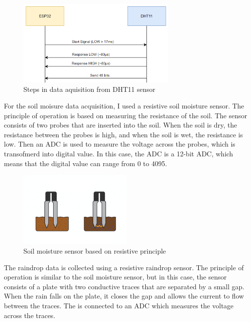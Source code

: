 \begin{figure}[H]
    \centering
    \includegraphics[width=0.7\textwidth]{images/dht-steps.png}
    \caption{Steps in data aquisition from DHT11 sensor}
    \label{fig:dht-steps}
\end{figure}

For the soil moisure data acquisition, I used a resistive soil moisture sensor. The principle of operation is based
on measuring the resistance of the soil. The sensor consists of two probes that are inserted into the soil.
When the soil is dry, the resistance between the probes is high, and when the soil is wet, the resistance is low\cite{s20020363}.
Then an ADC is used to measure the voltage across the probes, which is transofmerd into digital value. In this case, the
ADC is a 12-bit ADC, which means that the digital value can range from 0 to 4095.

\begin{figure}[H]
    \centering
    \includegraphics[width=0.5\textwidth]{images/moisture-sensor.png}
    \caption{Soil moisture sensor based on resistive principle}
    \label{fig:moisture-sensor}
\end{figure}

The raindrop data is collected using a resistive raindrop sensor. The principle of operation is similar to the soil moisture sensor, but 
in this case, the sensor consists of a plate with two conductive traces that are separated by a small gap.
When the rain falls on the plate, it closes the gap and allows the current to flow between the traces. The 
is connected to an ADC which measures the voltage across the traces.

